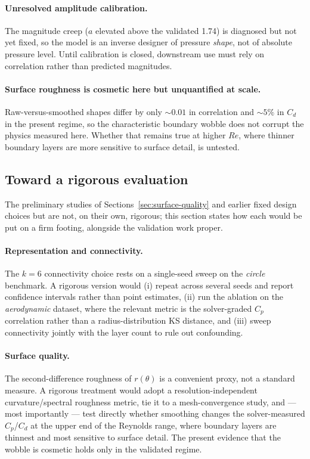 \paragraph{Unresolved amplitude calibration.} The magnitude creep ($a$ elevated above the validated
1.74) is diagnosed but not yet fixed, so the model is an inverse designer of pressure \emph{shape}, not
of absolute pressure level. Until calibration is closed, downstream use must rely on correlation rather
than predicted magnitudes.

\paragraph{Surface roughness is cosmetic here but unquantified at scale.} Raw-versus-smoothed shapes
differ by only $\sim 0.01$ in correlation and $\sim 5\%$ in $C_d$ in the present regime, so the
characteristic boundary wobble does not corrupt the physics measured here. Whether that remains true at
higher $Re$, where thinner boundary layers are more sensitive to surface detail, is untested.

\subsection{Toward a rigorous evaluation}
\label{sec:toward-rigour}

The preliminary studies of Sections~\ref{sec:surface-quality} and earlier fixed design choices but are
not, on their own, rigorous; this section states how each would be put on a firm footing, alongside the
validation work proper.

\paragraph{Representation and connectivity.} The $k = 6$ connectivity choice rests on a single-seed
sweep on the \emph{circle} benchmark. A rigorous version would (i) repeat across several seeds and
report confidence intervals rather than point estimates, (ii) run the ablation on the \emph{aerodynamic}
dataset, where the relevant metric is the solver-graded $C_p$ correlation rather than a
radius-distribution KS distance, and (iii) sweep connectivity jointly with the layer count to rule out
confounding.

\paragraph{Surface quality.} The second-difference roughness of $r(\theta)$ is a convenient proxy, not a
standard measure. A rigorous treatment would adopt a resolution-independent curvature/spectral roughness
metric, tie it to a mesh-convergence study, and --- most importantly --- test directly whether smoothing
changes the solver-measured $C_p$/$C_d$ at the upper end of the Reynolds range, where boundary layers
are thinnest and most sensitive to surface detail. The present evidence that the wobble is cosmetic
holds only in the validated regime.

